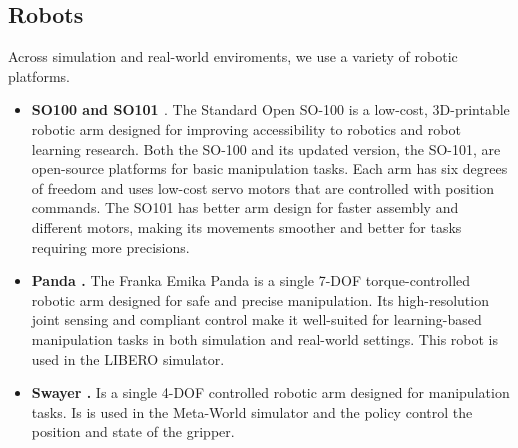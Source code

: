 

\subsection{Robots}
Across simulation and real-world enviroments, we use a variety of robotic platforms.
\begin{itemize}
    \item \textbf{SO100 and SO101 \citep{cadene2024lerobot}}. The Standard Open SO-100 is a low-cost, 3D-printable robotic arm designed for improving accessibility to robotics and robot learning research. Both the SO-100 and its updated version, the SO-101, are open-source platforms for basic manipulation tasks. Each arm has six degrees of freedom and uses low-cost servo motors that are controlled with position commands. The SO101 has better arm design for faster assembly and different motors, making its movements smoother and better for tasks requiring more precisions.
    \item \textbf{Panda \citep{haddadin2022franka}.} The Franka Emika Panda is a single 7-DOF torque-controlled robotic arm designed for safe and precise manipulation. Its high-resolution joint sensing and compliant control make it well-suited for learning-based manipulation tasks in both simulation and real-world settings. This robot is used in the LIBERO simulator.
    \item \textbf{Swayer \citep{yu2020metaworld}.} Is a single 4-DOF controlled robotic arm designed for manipulation tasks. Is is used in the Meta-World simulator and the policy control the position and state of the gripper.    
\end{itemize}

